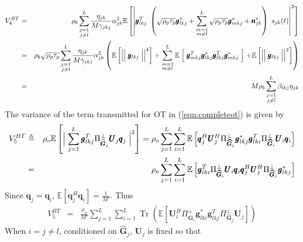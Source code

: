 \documentclass[10pt, a4paper, twoside,fleqn]{article}
\DeclareMathOperator{\Tr}{Tr}
\begin{document}
\begin{eqnarray}
V_4^{BT} &=& \rho_b\sum_{\substack{j=1 \\ j \neq l}}^{L}\frac{\eta_{jk}}{M\gamma_{jkj}}\alpha_{jk}^2\mathbb{E}\left[\left\vert \pmb{g}_{lkj}^T \ \left(\sqrt{\rho_p\tau_p}\pmb{g}^*_{lkj}
                          			 +\sum_{\substack{m=1 \\ m \neq l}}^{L} \sqrt{\rho_p\tau_p}\pmb{g}^*_{mkj}
             			   			 +\pmb{n}^*_{jk}\right) 
             			   	\ s_{jk} (t)\right\vert^2\right] \nonumber \\
         &=& \rho_b\sqrt{\rho_p\tau_p}\sum_{\substack{j=1 \\ j \neq l}}^{L}\frac{\eta_{jk}}{M\gamma_{jkj}}\alpha_{jk}^2\left(\mathbb{E}\left[\Bigm|\Bigm|\pmb{g}_{lkj}\Bigm|\Bigm|^4\right] + \sum\limits_{\substack{m=1 \\ m\neq l}}^{L}\mathbb{E}\Bigm[\pmb{g}^T_{mkj}\pmb{g}^*_{lkj}\pmb{g}^T_{lkj}\pmb{g}^*_{mkj}\Bigm]+\mathbb{E}\left[\Bigm|\Bigm|\pmb{g}_{lkj}\Bigm|\Bigm|^2\right]\right) \nonumber \\
    &=& M\rho_b\sum\limits_{\substack{j=1 \\ j \neq l}}^{L}\beta_{lkj}\eta_{jk}
\end{eqnarray}
The variance of the term transmitted for OT in (\ref{eqn:completeot}) is given by
\begin{eqnarray}
	V_5^{BT} &\triangleq& \rho_o\mathbb{E}\left[\Bigm|\sum_{j=1}^{L}\pmb{g}_{lkj}^T\Pi^{\perp}_{{\widehat{\pmb{G}}_j}}\pmb{U}_j \pmb{q}_{j}\Bigm|^2\right] 
	        = \rho_o\sum\limits_{j=1}^{L}\sum\limits_{i=1}^{L}\mathbb{E}\left[\pmb{q}_j^H\pmb{U}_j^H \Pi^{\perp}_{\pmb{\widehat{G}}_j} \pmb{g}_{lkj}^* \pmb{g}_{lki}^{T}\Pi^{\perp}_{\pmb{\widehat{G}}_i} \pmb{U}_i\pmb{q}_i\right] \nonumber \\
            &=&\rho_o\sum_{j=1}^{L}\sum_{i=1}^{L} \mathbb{E}\left[\pmb{g}_{lki}^{T}\Pi^{\perp}_{\pmb{\widehat{G}}_i}\pmb{U}_i\pmb{q}_i\pmb{q}^H_j\pmb{U}_j^H\Pi^{\perp}_{\pmb{\widehat{G}}_j}\pmb{g}_{lkj}^* \right] \nonumber
\end{eqnarray}
Since $\pmb{q}_j=\pmb{q}_i$, $\mathbb{E}[\pmb{q}_j^H\pmb{q}_i]=\frac{1}{M'}$. Thus
\begin{eqnarray}\label{eqn:noiseF4_1}	    
           V_5^{BT} &=&       \frac{\rho_o}{M'}\sum_{j=1}^{L}\sum_{i=1}^{L} \Tr\left(\mathbb{E}\left[\pmb{U}_i^H \Pi^{\perp}_{\pmb{\widehat{G}}_i} \pmb{g}_{lki}^* \pmb{g}_{lkj}^{T}\Pi^{\perp}_{\pmb{\widehat{G}}_j} \pmb{U}_j\right]\right)
\end{eqnarray}
When $i=j\neq l$, conditioned on $\pmb{\widehat{G}}_j$, $\pmb{U}_j$ is fixed so that
\end{document}
